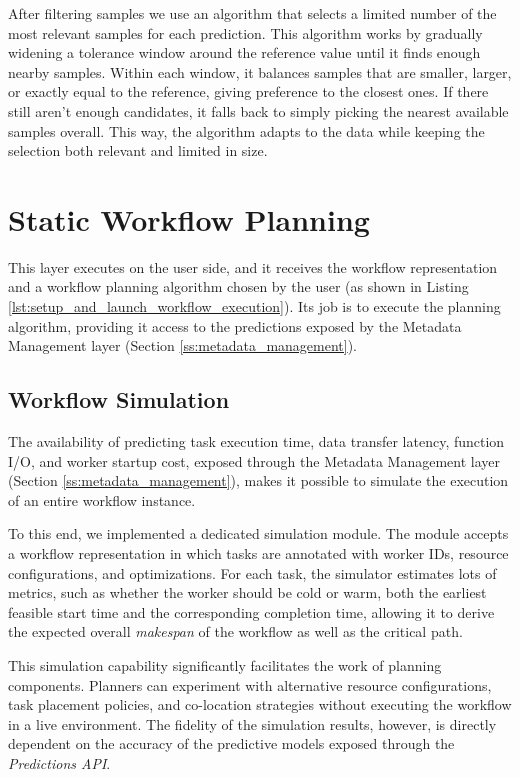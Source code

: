 After filtering samples we use an algorithm that selects a limited number of the most relevant samples for each prediction. This algorithm works by gradually widening a tolerance window around the reference value until it finds enough nearby samples. Within each window, it balances samples that are smaller, larger, or exactly equal to the reference, giving preference to the closest ones. If there still aren't enough candidates, it falls back to simply picking the nearest available samples overall. This way, the algorithm adapts to the data while keeping the selection both relevant and limited in size.


\section{Static Workflow Planning}

This layer executes on the user side, and it receives the workflow representation and a workflow planning algorithm chosen by the user (as shown in Listing \ref{lst:setup_and_launch_workflow_execution}). Its job is to execute the planning algorithm, providing it access to the predictions exposed by the Metadata Management layer (Section \ref{ss:metadata_management}).

\subsection{Workflow Simulation}
The availability of predicting task execution time, data transfer latency, function I/O, and worker startup cost, exposed through the Metadata Management layer (Section \ref{ss:metadata_management}), makes it possible to simulate the execution of an entire workflow instance.

To this end, we implemented a dedicated simulation module. The module accepts a workflow representation in which tasks are annotated with worker IDs, resource configurations, and optimizations. For each task, the simulator estimates lots of metrics, such as whether the worker should be cold or warm, both the earliest feasible start time and the corresponding completion time, allowing it to derive the expected overall \textit{makespan} of the workflow as well as the critical path.

This simulation capability significantly facilitates the work of planning components. Planners can experiment with alternative resource configurations, task placement policies, and co-location strategies without executing the workflow in a live environment. The fidelity of the simulation results, however, is directly dependent on the accuracy of the predictive models exposed through the \textit{Predictions API}.

